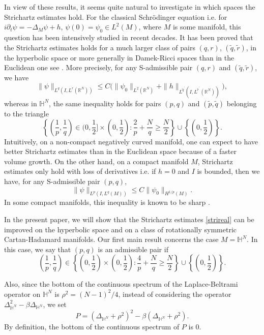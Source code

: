 \documentclass[10pt,leqno]{amsart}
\numberwithin{equation}{section}
\newcommand{\field}[1]{\mathbb{#1}}
\newcommand{\R}{\field{R}}          		%
\newcommand{\Hy}{\field{H}}
\begin{document}
In view of these results, it seems quite natural to investigate in which spaces the Strichartz estimates hold. For the classical Schr\" odinger equation i.e. for $i\partial_t \psi =-\Delta_M \psi +h $, $\psi(0)=\psi_0\in L^2 (M)$, where $M$ is some manifold, this question has been intensively studied in recent decades. It has been proved that the Strichartz estimates holds for a much larger class of pairs $(q,r)$, $(\tilde{q} ,\tilde{r})$, in the hyperbolic space or more generally in Damek-Ricci spaces than in the Euclidean one see \cite{MR2765426,MR2566713,banica2007,BaCaSt,MR2245889}. More precisely, for any S-admissible pair $(q,r)$ and $(\tilde{q} ,\tilde{r})$, we have
$$\|\psi\|_{L^q (I,L^r (\R^N))} \leq C \big(\|\psi_0\|_{L^2 (\R^N)} + \|h\|_{L^{\tilde{q}^\prime } (I,L^{\tilde{r}^\prime } (\R^N))}\big),$$
whereas in $\Hy^N$, the same inequality holds for pairs $(p,q)$ and $(\tilde{p} ,\tilde{q})$ belonging to the triangle
$$\left\lbrace \left(\dfrac{1}{p},\dfrac{1}{q}\right) \in (0,\dfrac{1}{2}] \times (0,\dfrac{1}{2} ) \colon \dfrac{2}{p}+ \dfrac{N}{q}\geq\dfrac{N}{2}\right\rbrace \cup \left\lbrace\left(0,\dfrac{1}{2}\right)\right\rbrace.$$
Intuitively, on a non-compact negatively curved manifold, one can expect to have better Strichartz estimates than in the Euclidean space because of a faster volume growth.
On the other hand, on a compact manifold $M$, Strichartz estimates only hold with loss of derivatives \cite{MR2058384} i.e. if $h=0$ and $I$ is bounded, then we have, for any S-admissible pair $(p,q)$,
$$\|\psi\|_{L^p (I,L^q (M))} \leq C \|\psi_0\|_{H^{1/p} (M)}. $$
In some compact manifolds, this inequality is known to be sharp \cite{MR1909648}. 

In the present paper, we will show that the Strichartz estimates \eqref{strireal} can be improved on the hyperbolic space and on a class of rotationally symmetric Cartan-Hadamard manifolds. Our first main result concerns the case $M=\Hy^N$. In this case, we say that $(p,q)$ is an admissible pair if %
$$\left(\frac{1}{p},\frac{1}{q}\right)\in  \left\lbrace\left(0,\frac{1}{2} \right)\times \left(0,\frac{1}{2}\right) \colon \frac{4}{p} +\frac{N}{q} \geq \frac{N}{2} \right\rbrace \cup \left\lbrace\left(0,\frac{1}{2}\right) \right\rbrace.$$

Also, since the bottom of the continuous spectrum of the Laplace-Beltrami operator on $\Hy^N$ is $\rho^2 = (N-1)^2/4$, instead of considering the operator $\Delta_{\Hy^N}^2 - \beta \Delta_{\Hy^N}$, we set
$$P=(\Delta_{\Hy^N} +\rho^2)^2 - \beta (\Delta_{\Hy^N} +\rho^2).$$
By definition, the bottom of the continuous spectrum of $P$ is $0$.  
\end{document}
